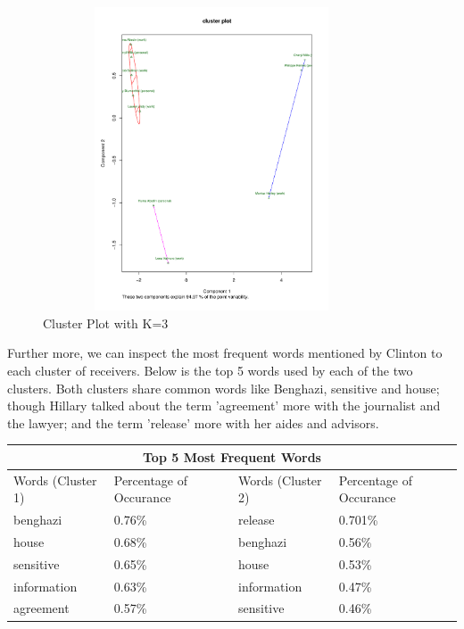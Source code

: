 \begin{figure}[h!]
    \centering
    \includegraphics[width=10cm,height=9cm]
    {daitong_and_yihe/c3.pdf}
    \caption{Cluster Plot with K=3}
\end{figure}

\newpage
Further more, we can inspect the most frequent words mentioned by Clinton to each cluster of receivers. Below is the top 5 words used by each of the two clusters. Both clusters share common words like Benghazi, sensitive and house; though Hillary talked about the term 'agreement' more with the journalist and the lawyer; and the term 'release' more with her aides and advisors. 
\\

\begin{center}
\begin{tabular}{ |p{3cm}|p{3cm}|| p{3cm}|p{3cm}|  }
 \hline
 \multicolumn{4}{|c|}{Top 5 Most Frequent Words} \\
 \hline
 Words (Cluster 1)  & Percentage of Occurance & Words (Cluster 2) & Percentage of Occurance\\
 \hline
 benghazi & 0.76\% & release  & 0.701\% \\
 house &  0.68\% & benghazi & 0.56\% \\
 sensitive & 0.65\% & house & 0.53\%\\
 information & 0.63\% & information & 0.47\%\\
 agreement & 0.57\% &  sensitive  & 0.46\% \\
 \hline
\end{tabular}
\end{center}
